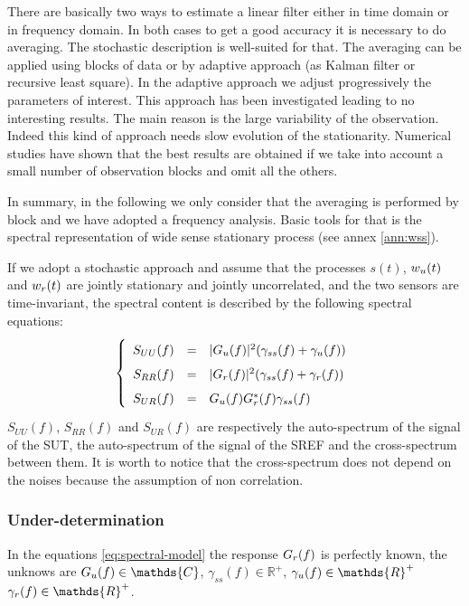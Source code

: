 There are basically two ways to estimate a linear filter either in time domain or in frequency domain. In both cases to get a good accuracy it is necessary to do averaging. The stochastic description is well-suited for that. The averaging can be applied using blocks of data or by adaptive approach (as Kalman filter or recursive least square). In the adaptive approach we adjust progressively the parameters of interest. This approach has been investigated leading to no interesting results. The main reason is the large variability of the observation. Indeed this kind of approach needs slow evolution of the stationarity. Numerical studies have shown that the best results are obtained if we take into account a small number of observation blocks and omit all the others.

In summary, in the following we only consider that the averaging is performed by block and we have adopted a frequency analysis. Basic tools for that is the spectral representation of wide sense stationary process (see annex \ref{ann:wss}).


If we adopt a stochastic approach and assume that the processes $s(t)$, $w_{{u}}(t)$ and $w_{{r}}(t)$ are jointly stationary and jointly uncorrelated, and the two sensors are time-invariant, the spectral content is described by the following spectral equations:
\begin{eqnarray}
\label{eq:spectral-model}
\left\{
\renewcommand\arraystretch{1.6}
\begin{array}{rcl}
S_{UU}(f)&=&|G_{\ut}(f)|^{2} (\gamma_{ss}(f)+\gamma_{\ut}(f))
\\
S_{RR}(f)&=&|G_{\rf}(f)|^{2} (\gamma_{ss}(f)+\gamma_{\rf}(f))
\\
S_{UR}(f)&=&G_{\ut}(f)G^{*}_{\rf}(f)\gamma_{ss}(f)
\end{array}
\right.
\end{eqnarray}
$S_{UU}(f)$, $S_{RR}(f)$ and $S_{UR}(f)$ are respectively the auto-spectrum of the signal of the SUT, the auto-spectrum of the signal of the SREF and the cross-spectrum between them. It is worth to notice that the cross-spectrum does not depend on the noises because the assumption of non correlation.

\subsubsection{Under-determination}
In the equations \eqref{eq:spectral-model} the response $G_{{r}}(f)$ is perfectly known, the unknows are $G_{\ut}(f)\in\mathds{C}$, $\gamma_{ss}(f)\in\mathds{R}^{+}$,  $\gamma_{\ut}(f)\in\mathds{R}^{+}$
$\gamma_{\rf}(f)\in\mathds{R}^{+}$. 
 

